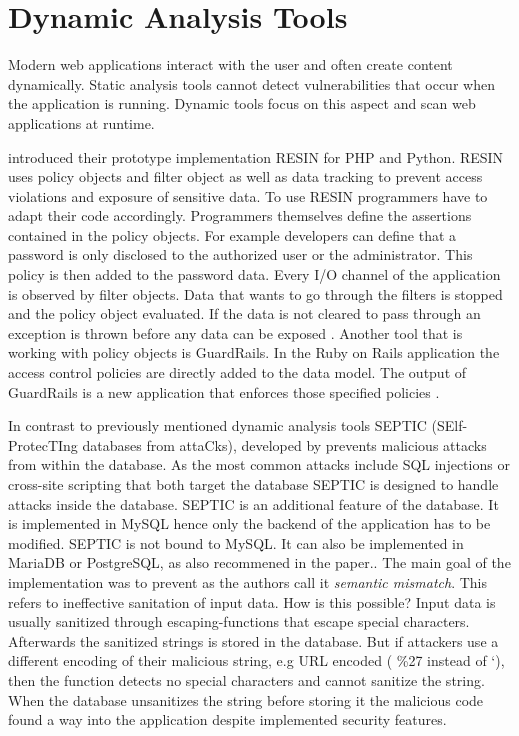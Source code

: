 \section{Dynamic Analysis Tools}
Modern web applications interact with the user and often create content dynamically. Static analysis tools cannot detect vulnerabilities that occur when the application is running. Dynamic tools focus on this aspect and scan web applications at runtime.\newline


\textcite[]{Yip2009} introduced their prototype implementation RESIN for PHP and Python. RESIN uses policy objects and filter object as well as data tracking to prevent access violations and exposure of sensitive data. To use RESIN programmers have to adapt their code accordingly. Programmers themselves define the assertions contained in the policy objects. For example developers can define that a password is only disclosed to the authorized user or the administrator. This policy is then added to the password data. Every I/O channel of the application is observed by filter objects. Data that wants to go through the filters is stopped and the policy object evaluated. If the data is not cleared to pass through an exception is thrown before any data can be exposed \autocite[3-7]{Yip2009}. Another tool that is working with policy objects is GuardRails\autocite[]{Felt2011}. In the Ruby on Rails application the access control policies are directly added to the data model. The output of GuardRails is a new application that enforces those specified policies \autocite[2-4]{Felt2011}.\newline


In contrast to previously mentioned dynamic analysis tools SEPTIC (SElf-ProtecTIng databases from attaCks), developed by \textcite[]{Medeiros2019} prevents malicious attacks from within the database. As the most common attacks include SQL injections or cross-site scripting that both target the database SEPTIC is designed to handle attacks inside the database. SEPTIC is an additional feature of the database. It is implemented in MySQL hence only the backend of the application has to be modified. SEPTIC is not bound to MySQL. It can also be implemented in MariaDB or PostgreSQL, as also recommened in the paper.\autocite[1185]{Medeiros2019}.\newline
The main goal of the implementation was to prevent as the authors call it \textit{semantic mismatch}\autocite[1168]{Medeiros2019}. This refers to ineffective sanitation of input data. How is this possible? Input data is usually sanitized through escaping-functions that escape special characters. Afterwards the sanitized strings is stored in the database. But if attackers use a different encoding of their malicious string, e.g URL encoded ( \%27 instead of `), then the function detects no special characters and cannot sanitize the string. When the database unsanitizes the string before storing it the malicious code found a way into the application despite implemented security features.\newline


